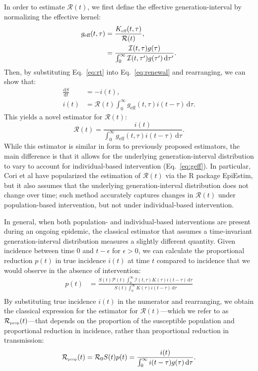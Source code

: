 \documentclass[12pt]{article}
\newcommand{\eref}[1]{Eq.~\ref{eq:#1}}
\newcommand{\Rx}[1]{\ensuremath{{\mathcal R}_{#1}}\xspace}
\newcommand{\Ro}{\Rx{0}}
\newcommand{\RR}{\ensuremath{{\mathcal R}}\xspace}
\newcommand{\tsub}[2]{#1_{{\textrm{\tiny #2}}}}
\newcommand{\dd}[1]{\ensuremath{\, \mathrm{d}#1}}
\newcommand{\dtau}{\dd{\tau}}
\newcommand{\Keff}{\ensuremath{\tsub{K}{eff}}\xspace}
\newcommand{\geff}{g_{\textrm{eff}}} %
\newcommand{\PP}{{\mathcal P}}
\newcommand{\II}{{\mathcal I}}
\begin{document}
In order to estimate $\RR(t)$, we first define the effective generation-interval by normalizing the effective kernel:
\begin{align}
\geff(t, \tau) &= \frac{\Keff(t, \tau)}{\RR(t)},\\
&= \frac{\II(t,\tau) g(\tau)}{\int_0^\infty \II(t,\tau') g(\tau') \dtau'}.
\label{eq:geff}
\end{align}
Then, by substituting \eref{rt} into \eref{renewal} and rearranging, we can show that:
\begin{equation}
\begin{aligned}
\frac{\mathrm{d}S}{\mathrm{d}t} &= - i(t),\\
i(t) &= \RR(t) \int_0^\infty \geff(t, \tau) i(t-\tau) \dtau.
\end{aligned}
\end{equation}
This yields a novel estimator for $\RR(t)$:
\begin{equation}
\RR(t) = \frac{i(t)}{\int_0^\infty \geff(t, \tau) i(t-\tau) \dtau}.
\end{equation}
While this estimator is similar in form to previously proposed estimators, the main difference is that it allows for the underlying generation-interval distribution to vary to account for individual-based intervention (\eref{geff}).
In particular, Cori et al have popularized the estimation of $\RR(t)$ via the R package EpiEstim, but it also assumes that the underlying generation-interval distribution does not change over time; 
such method accurately captures changes in $\RR(t)$ under population-based intervention, but not under individual-based intervention.

In general, when both population- and individual-based interventions are present during an ongoing epidemic, the classical estimator that assumes a time-invariant generation-interval distribution measures a slightly different quantity.
Given incidence between time $0$ and $t-\epsilon$ for $\epsilon > 0$, we can calculate the proportional reduction $p(t)$ in true incidence $i(t)$ at time $t$ compared to incidence that we would observe in the absence of intervention:
\begin{align}
p(t) &= \frac{S(t) \PP(t) \int_0^\infty \II(t, \tau) K(\tau) i(t-\tau)\dtau}{S(t) \int_0^\infty K(\tau) i(t-\tau) \dtau}\\
\end{align}
By substituting true incidence $i(t)$ in the numerator and rearranging, we obtain the classical expression for the estimator for $\RR(t)$---which we refer to as $\tsub{\RR}{prop}(t)$---that depends on the proportion of the susceptible population and proportional reduction in incidence, rather than proportional reduction in transmission:
\begin{equation}
\tsub{\RR}{prop}(t) = \Ro S(t) p(t) = \frac{i(t)}{\int_0^\infty i(t-\tau) g(\tau) \dtau}.
\end{equation}
\end{document}
